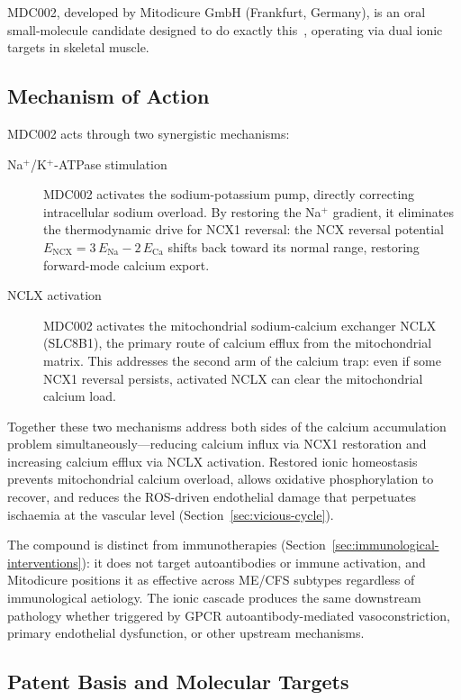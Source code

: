 MDC002, developed by Mitodicure GmbH (Frankfurt, Germany), is an oral small-molecule candidate designed to do exactly this~\cite{Mitodicure2024pipeline}, operating via dual ionic targets in skeletal muscle.

\subsection{Mechanism of Action}

MDC002 acts through two synergistic mechanisms:

\begin{description}
    \item[Na$^+$/K$^+$-ATPase stimulation] MDC002 activates the sodium-potassium pump, directly correcting intracellular sodium overload. By restoring the Na$^+$ gradient, it eliminates the thermodynamic drive for NCX1 reversal: the NCX reversal potential $E_{\text{NCX}} = 3\,E_{\text{Na}} - 2\,E_{\text{Ca}}$ shifts back toward its normal range, restoring forward-mode calcium export.

    \item[NCLX activation] MDC002 activates the mitochondrial sodium-calcium exchanger NCLX (SLC8B1), the primary route of calcium efflux from the mitochondrial matrix. This addresses the second arm of the calcium trap: even if some NCX1 reversal persists, activated NCLX can clear the mitochondrial calcium load.
\end{description}

Together these two mechanisms address both sides of the calcium accumulation problem simultaneously---reducing calcium influx via NCX1 restoration and increasing calcium efflux via NCLX activation. Restored ionic homeostasis prevents mitochondrial calcium overload, allows oxidative phosphorylation to recover, and reduces the ROS-driven endothelial damage that perpetuates ischaemia at the vascular level (Section~\ref{sec:vicious-cycle}).

The compound is distinct from immunotherapies (Section~\ref{sec:immunological-interventions}): it does not target autoantibodies or immune activation, and Mitodicure positions it as effective across ME/CFS subtypes regardless of immunological aetiology. The ionic cascade produces the same downstream pathology whether triggered by GPCR autoantibody-mediated vasoconstriction, primary endothelial dysfunction, or other upstream mechanisms.

\subsection{Patent Basis and Molecular Targets}

